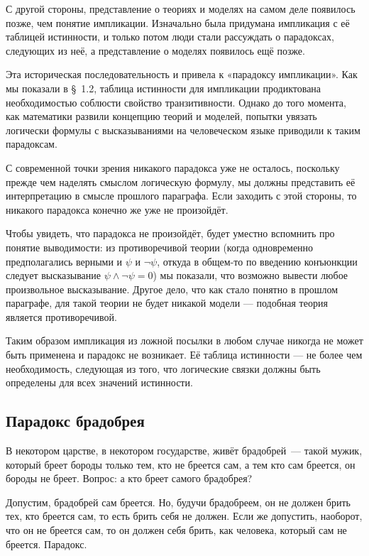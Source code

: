 С другой стороны, представление о теориях и моделях на самом деле появилось позже, чем понятие импликации. Изначально была придумана импликация с её таблицей истинности, и только потом люди стали рассуждать о парадоксах, следующих из неё, а представление о моделях появилось ещё позже.

Эта историческая последовательность и привела к  «парадоксу импликации». Как мы показали в \S~1.2, таблица истинности для импликации продиктована необходимостью соблюсти свойство транзитивности. Однако до того момента, как математики развили концепцию теорий и моделей, попытки увязать логически формулы с высказываниями на человеческом языке приводили к таким парадоксам.

С современной точки зрения никакого парадокса уже не осталось, поскольку прежде чем наделять смыслом логическую формулу, мы должны представить её интерпретацию в смысле прошлого параграфа. Если заходить с этой  стороны, то никакого парадокса конечно же уже не произойдёт.

Чтобы увидеть, что парадокса не произойдёт, будет уместно вспомнить про понятие выводимости: из противоречивой теории (когда одновременно предполагались верными и $\psi$ и $\neg\psi$, откуда в общем-то по введению конъюнкции следует высказывание $\psi\wedge\neg\psi=0$) мы показали, что возможно вывести любое произвольное высказывание. Другое дело, что как стало понятно в прошлом параграфе, для такой теории не будет никакой модели — подобная теория является противоречивой.

Таким образом импликация из ложной посылки в любом случае никогда не может быть применена и парадокс не возникает. Её таблица истинности — не более чем необходимость, следующая из того, что логические связки должны быть определены для всех значений истинности.

\subsection{Парадокс брадобрея}

В некотором царстве, в некотором государстве, живёт брадобрей~— такой мужик, который бреет бороды только тем, кто не бреется сам, а тем кто сам бреется, он бороды не бреет. Вопрос: а кто бреет самого брадобрея?

Допустим, брадобрей сам бреется. Но, будучи брадобреем, он не должен брить тех, кто бреется сам, то есть брить себя не должен. Если же допустить, наоборот, что он не бреется сам, то он должен себя брить, как человека, который сам не бреется. Парадокс.

